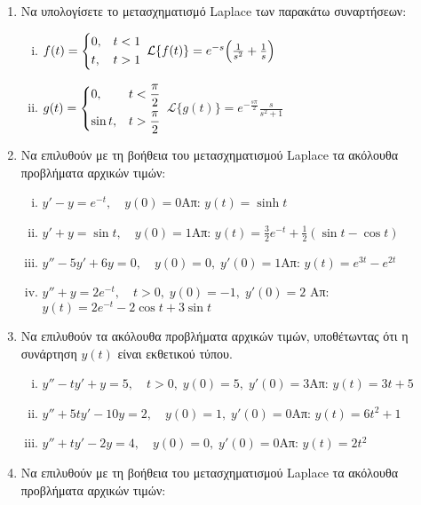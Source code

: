 \begin{enumerate}
  \item Να υπολογίσετε το μετασχηματισμό Laplace των παρακάτω συναρτήσεων:
    \begin{enumerate}[i)]
      \item $f(t)=\begin{dcases} 0, & t<1 \\ t, & t>1 \end{dcases}$ \hfill 
        $\mathcal{L}\{f(t)\}=e^{-s}\Bigl(\frac{1}{s^2}+\frac{1}{s}\Bigr)$
      \item $g(t)=\begin{dcases} 0, & t<\frac{\pi}{2} \\ \sin t, & t>\frac{\pi}{2} 
        \end{dcases}$ \hfill $\mathcal{L}\{g(t)\}=e^{-\frac{s\pi}{2}}\frac{s}{s^2+1}$
    \end{enumerate}

  \item Να επιλυθούν με τη βοήθεια του μετασχηματισμού Laplace τα ακόλουθα προβλήματα 
    αρχικών τιμών:
    \begin{enumerate}[i)]
      \item $y'-y=e^{-t},\quad y(0)=0$\hfill Απ: $y(t)=\sinh t$
      \item $y'+y=\sin t,\quad y(0)=1$\hfill Απ: $y(t)=\frac{3}{2}e^{-t}+
        \frac{1}{2}(\sin t-\cos t)$
      \item $y''-5y'+6y=0,\quad y(0)=0, \; y'(0)=1$\hfill Απ: $y(t)=e^{3t}-e^{2t}$
      \item $y''+y=2e^{-t},\quad t>0,\; y(0)=-1,\; y'(0)=2$
        \hfill Απ: $y(t)=2e^{-t}-2\cos t+3 \sin t$
    \end{enumerate}

  \item\label{it:ekth} Να επιλυθούν τα ακόλουθα προβλήματα αρχικών τιμών, υποθέτωντας 
    ότι η συνάρτηση $ y(t) $ είναι εκθετικού τύπου.
    \begin{enumerate}[i)]
      \item $y''-ty'+y=5, \quad t>0,\; y(0)=5,\; y'(0)=3$\hfill Απ: $y(t)=3t+5$
      \item $y'' +5ty'-10y=2, \quad y(0)=1,\; y'(0)=0$\hfill Απ: $y(t)=6t^2+1$
      \item $y'' +ty'-2y=4, \quad y(0)=0,\; y'(0)=0$\hfill Απ: $y(t)=2t^2$
    \end{enumerate}

  \item Να επιλυθούν με τη βοήθεια του μετασχηματισμού Laplace τα ακόλουθα προβλήματα 
    αρχικών τιμών:


\end{enumerate}
